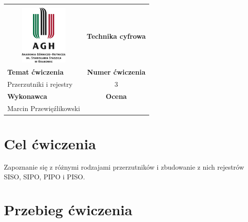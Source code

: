 \documentclass[12pt,a4paper]{article}
\begin{document}
\begin{table}[H]
\label{my-label}
\begin{tabular}[width=\textwidth, height=0.5]{|c|c|}
\hline
									           					&                           \\
\includegraphics[height=3cm]{img/logo}             					& \textbf{Technika cyfrowa} \\ \hline
\multicolumn{1}{|l|}{\textbf{Temat ćwiczenia}} 					& \textbf{Numer ćwiczenia}  \\
\multicolumn{1}{|l|}{Przerzutniki i rejestry}	& 3                         \\ \hline
\multicolumn{1}{|l|}{\textbf{Wykonawca}}       & \textbf{Ocena}            \\
\multicolumn{1}{|l|}{Marcin Przewięźlikowski}          &                           \\ \hline
\end{tabular}
\end{table}

\section{Cel ćwiczenia}
Zapoznanie się z różnymi rodzajami przerzutników i zbudowanie z nich rejestrów SISO, SIPO, PIPO i PISO.

\section{Przebieg ćwiczenia}
\end{document}
